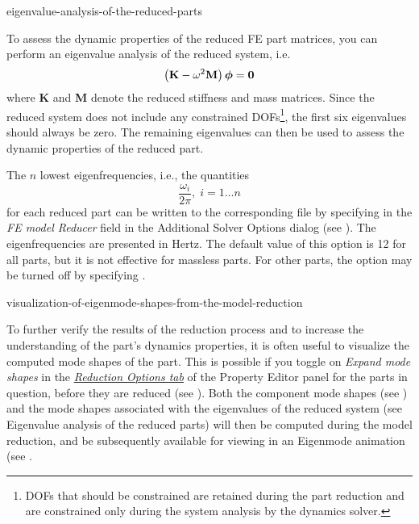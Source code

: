            {eigenvalue-analysis-of-the-reduced-parts}

To assess the dynamic properties of the reduced FE part matrices,
you can perform an eigenvalue analysis of the reduced system, i.e.
$$\left({\bf K} - \omega^2{\bf M}\right)\mbox{\boldmath$\phi$} = {\bf 0}$$
where \textbf{K} and \textbf{M} denote the reduced stiffness and mass matrices.
Since the reduced system does not include any constrained DOFs\footnote{
DOFs that should be constrained are retained during the part reduction and are
constrained only during the system analysis by the dynamics solver.},
the first six eigenvalues should always be zero. The remaining eigenvalues
can then be used to assess the dynamic properties of the reduced part.

The $n$ lowest eigenfrequencies, i.e., the quantities
$$\frac{\omega_i}{2\pi}, \; i = 1 \ldots n $$
for each reduced part can be written to the corresponding  file
by specifying  in the {\sl FE model Reducer} field in the
Additional Solver Options dialog (see
).
The eigenfrequencies are presented in Hertz.
The default value of this option is 12 for all parts,
but it is not effective for massless parts.
For other parts, the option may be turned off by specifying .


           {visualization-of-eigenmode-shapes-from-the-model-reduction}

To further verify the results of the reduction process and to increase
the understanding of the part's dynamics properties, it is often useful
to visualize the computed mode shapes of the part.
This is possible if you toggle on {\sl Expand mode shapes} in the
\protect\hyperlink{reduction-options-tab}{\sl Reduction Options tab}
of the Property Editor panel for the parts in question, before they are reduced
(see ).
Both the component mode shapes
(see )
and the mode shapes associated with the eigenvalues of the reduced system
(see 
{Eigenvalue analysis of the reduced parts}) will then be computed during the
model reduction, and be subsequently available for viewing in an Eigenmode
animation
(see .

